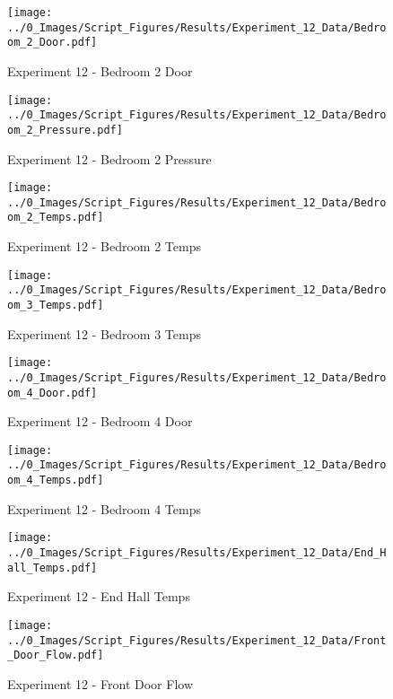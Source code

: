 	\begin{figure}[H]
		\centering
		\texttt{[image: ../0\_Images/Script\_Figures/Results/Experiment\_12\_Data/Bedroom\_2\_Door.pdf]}
		\caption[]{Experiment 12 - Bedroom 2 Door}
	\end{figure}
 
	\clearpage

	\begin{figure}[H]
		\centering
		\texttt{[image: ../0\_Images/Script\_Figures/Results/Experiment\_12\_Data/Bedroom\_2\_Pressure.pdf]}
		\caption[]{Experiment 12 - Bedroom 2 Pressure}
	\end{figure}
 

	\begin{figure}[H]
		\centering
		\texttt{[image: ../0\_Images/Script\_Figures/Results/Experiment\_12\_Data/Bedroom\_2\_Temps.pdf]}
		\caption[]{Experiment 12 - Bedroom 2 Temps}
	\end{figure}
 
	\clearpage

	\begin{figure}[H]
		\centering
		\texttt{[image: ../0\_Images/Script\_Figures/Results/Experiment\_12\_Data/Bedroom\_3\_Temps.pdf]}
		\caption[]{Experiment 12 - Bedroom 3 Temps}
	\end{figure}
 

	\begin{figure}[H]
		\centering
		\texttt{[image: ../0\_Images/Script\_Figures/Results/Experiment\_12\_Data/Bedroom\_4\_Door.pdf]}
		\caption[]{Experiment 12 - Bedroom 4 Door}
	\end{figure}
 
	\clearpage

	\begin{figure}[H]
		\centering
		\texttt{[image: ../0\_Images/Script\_Figures/Results/Experiment\_12\_Data/Bedroom\_4\_Temps.pdf]}
		\caption[]{Experiment 12 - Bedroom 4 Temps}
	\end{figure}
 

	\begin{figure}[H]
		\centering
		\texttt{[image: ../0\_Images/Script\_Figures/Results/Experiment\_12\_Data/End\_Hall\_Temps.pdf]}
		\caption[]{Experiment 12 - End Hall Temps}
	\end{figure}
 
	\clearpage

	\begin{figure}[H]
		\centering
		\texttt{[image: ../0\_Images/Script\_Figures/Results/Experiment\_12\_Data/Front\_Door\_Flow.pdf]}
		\caption[]{Experiment 12 - Front Door Flow}
	\end{figure}
 

